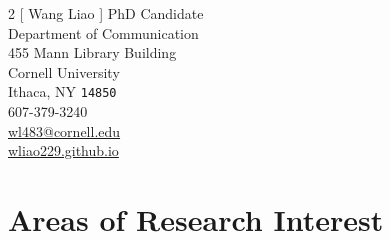 \documentclass[11pt, letterpaper]{article} %
\begin{document}
\thispagestyle{empty}

\begin{multicols}{2}
[
{\LARGE Wang Liao} %
]
PhD Candidate\\
Department of Communication\\
455 Mann Library Building\\ %
Cornell University\\
Ithaca, NY \texttt{14850}\\

\columnbreak
{\tiny {}} 607-379-3240\\ %
{\tiny {}} \href{mailto:wl483@cornell.edu}{wl483@cornell.edu}\\ %
{\tiny {}} \href{https://wliao229.github.io}{wliao229.github.io}\\ %

\end{multicols}




\section*{Areas of Research Interest}
\end{document}
